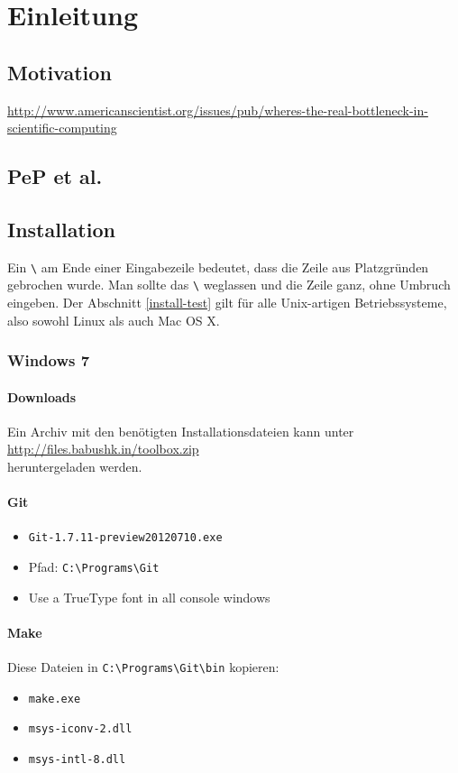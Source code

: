 \chapter{Einleitung}
\section{Motivation}
\url{http://www.americanscientist.org/issues/pub/wheres-the-real-bottleneck-in-scientific-computing}
\section{PeP et al.}

\section{Installation}
Ein \verb|\| am Ende einer Eingabezeile bedeutet, dass die Zeile aus Platzgründen gebrochen wurde.
Man sollte das \verb|\| weglassen und die Zeile ganz, ohne Umbruch eingeben.
Der Abschnitt \ref{install-test} gilt für alle Unix-artigen Betriebssysteme, also sowohl Linux als auch Mac OS X.
\subsection{Windows 7}
\subsubsection{Downloads}
Ein Archiv mit den benötigten Installationsdateien kann unter \\
\url{http://files.babushk.in/toolbox.zip} \\
heruntergeladen werden.

\subsubsection{Git}
\begin{itemize}
  \item \texttt{Git-1.7.11-preview20120710.exe}
  \item Pfad: \verb|C:\Programs\Git|
  \item Use a TrueType font in all console windows
\end{itemize}

\subsubsection{Make}
Diese Dateien in \verb|C:\Programs\Git\bin| kopieren:
\begin{itemize}
  \item \texttt{make.exe}
  \item \texttt{msys-iconv-2.dll}
  \item \texttt{msys-intl-8.dll}
\end{itemize}

